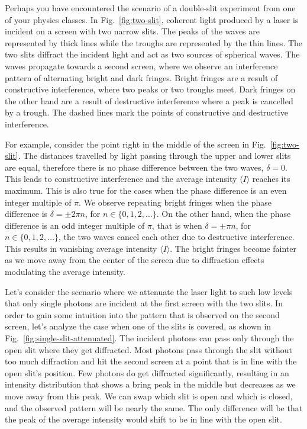 Perhaps you have encountered the scenario of a double-slit experiment from one of your physics classes.
In Fig.~\ref{fig:two-slit}, coherent light produced by a laser is incident on a screen with two narrow slits.
The peaks of the waves are represented by thick lines while the troughs are represented by the thin lines.
The two slits diffract the incident light and act as two sources of spherical waves.
The waves propagate towards a second screen, where we observe an interference pattern of alternating bright and dark fringes.
Bright fringes are a result of constructive interference, where two peaks or two troughs meet.
Dark fringes on the other hand are a result of destructive interference where a peak is cancelled by a trough.
The dashed lines mark the points of constructive and destructive interference.

For example, consider the point right in the middle of the screen in Fig.~\ref{fig:two-slit}.
The distances travelled by light passing through the upper and lower slits are equal, therefore there is no phase difference between the two waves, $\delta=0$.
This leads to constructive interference and the average intensity $\langle I\rangle$ reaches its maximum.
This is also true for the cases when the phase difference is an even integer multiple of $\pi$.
We observe repeating bright fringes when the phase difference is $\delta=\pm 2\pi n$, for $n\in\{0,1,2,\ldots\}$.
On the other hand, when the phase difference is an odd integer multiple of $\pi$, that is when $\delta=\pm \pi n$, for $n\in\{0,1,2,\ldots\}$, the two waves cancel each other due to destructive interference.
This results in vanishing average intensity $\langle I \rangle$.
The bright fringes become fainter as we move away from the center of the screen due to diffraction effects modulating the average intensity.

Let's consider the scenario where we attenuate the laser light to such low levels that only single photons are incident at the first screen with the two slits.
In order to gain some intuition into the pattern that is observed on the second screen, let's analyze the case when one of the slits is covered, as shown in Fig.~\ref{fig:single-slit-attenuated}.
The incident photons can pass only through the open slit where they get diffracted.
Most photons pass through the slit without too much diffraction and hit the second screen at a point that is in line with the open slit's position.
Few photons do get diffracted significantly, resulting in an intensity distribution that shows a bring peak in the middle but decreases as we move away from this peak.
We can swap which slit is open and which is closed, and the observed pattern will be nearly the same.
The only difference will be that the peak of the average intensity would shift to be in line with the open slit.

